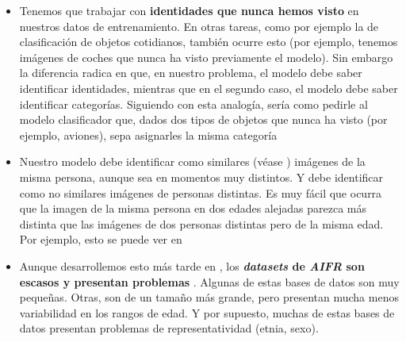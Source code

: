 \begin{itemize}
\item Tenemos que trabajar con \textbf{identidades que nunca hemos visto} en nuestros datos de entrenamiento. En otras tareas, como por ejemplo la de clasificación de objetos cotidianos, también ocurre esto (por ejemplo, tenemos imágenes de coches que nunca ha visto previamente el modelo). Sin embargo la diferencia radica en que, en nuestro problema, el modelo debe saber identificar identidades, mientras que en el segundo caso, el modelo debe saber identificar categorías. Siguiendo con esta analogía, sería como pedirle al modelo clasificador que, dados dos tipos de objetos que nunca ha visto (por ejemplo, aviones), sepa asignarles la misma categoría

\item Nuestro modelo debe identificar como similares (véase ) imágenes de la misma persona, aunque sea en momentos muy distintos. Y debe identificar como no similares imágenes de personas distintas. Es muy fácil que ocurra que la imagen de la misma persona en dos edades alejadas parezca más distinta que las imágenes de dos personas distintas pero de la misma edad. Por ejemplo, esto se puede ver en 

\item Aunque desarrollemos esto más tarde en , los \textbf{\textit{datasets} de \textit{AIFR} son escasos y presentan problemas} \cite{informatica:tecnica_sintesis_aifr}. Algunas de estas bases de datos son muy pequeñas. Otras, son de un tamaño más grande, pero presentan mucha menos variabilidad en los rangos de edad. Y por supuesto, muchas de estas bases de datos presentan problemas de representatividad (etnia, sexo).
\end{itemize}

